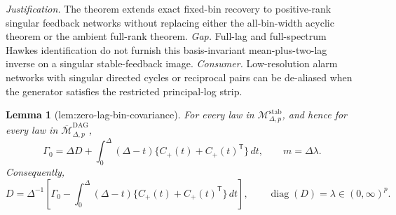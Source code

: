 \documentclass{article}
\newtheorem{lemma}{Lemma}
\begin{document}
\par\smallskip\noindent \textit{Justification.} The theorem extends exact fixed-bin recovery to positive-rank singular feedback networks without replacing either the all-bin-width acyclic theorem or the ambient full-rank theorem. \textit{Gap.} Full-lag and full-spectrum Hawkes identification do not furnish this basis-invariant mean-plus-two-lag inverse on a singular stable-feedback image. \textit{Consumer.} Low-resolution alarm networks with singular directed cycles or reciprocal pairs can be de-aliased when the generator satisfies the restricted principal-log strip.

\begin{lemma}[lem:zero-lag-bin-covariance]\label{lem:zero-lag-bin-covariance}
For every law in \(\mathcal M_{\Delta,p}^{\mathrm{stab}}\), and hence for every law in \(\overline{\mathcal M}_{\Delta,p}^{\mathrm{DAG}}\),
\[
 \Gamma_0=\Delta D+\int_0^\Delta(\Delta-t)
 \{C_{+}(t)+C_{+}(t)^{\mathsf T}\}\,dt,
 \qquad m=\Delta\lambda.
\]
Consequently,
\[
 D=\Delta^{-1}\!\left[\Gamma_0-
 \int_0^\Delta(\Delta-t)
 \{C_{+}(t)+C_{+}(t)^{\mathsf T}\}\,dt\right],
 \qquad \operatorname{diag}(D)=\lambda\in(0,\infty)^p.
\]
\end{lemma}
\end{document}
